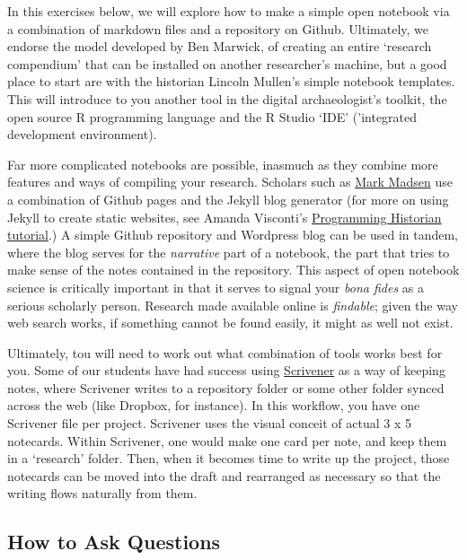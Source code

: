 \documentclass[english,]{book}
\begin{document}
In this exercises below, we will explore how to make a simple open
notebook via a combination of markdown files and a repository on Github.
Ultimately, we endorse the model developed by Ben Marwick, of creating
an entire `research compendium' that can be installed on another
researcher's machine, but a good place to start are with the historian
Lincoln Mullen's simple notebook templates. This will introduce to you
another tool in the digital archaeologist's toolkit, the open source R
programming language and the R Studio `IDE' ('integrated development
environment).

Far more complicated notebooks are possible, inasmuch as they combine
more features and ways of compiling your research. Scholars such as
\href{http://notebook.madsenlab.org/}{Mark Madsen} use a combination of
Github pages and the Jekyll blog generator (for more on using Jekyll to
create static websites, see Amanda Visconti's
\href{http://programminghistorian.org/lessons/building-static-sites-with-jekyll-github-pages}{Programming
Historian tutorial}.) A simple Github repository and Wordpress blog can
be used in tandem, where the blog serves for the \emph{narrative} part
of a notebook, the part that tries to make sense of the notes contained
in the repository. This aspect of open notebook science is critically
important in that it serves to signal your \emph{bona fides} as a
serious scholarly person. Research made available online is
\emph{findable}; given the way web search works, if something cannot be
found easily, it might as well not exist.

Ultimately, tou will need to work out what combination of tools works
best for you. Some of our students have had success using
\href{https://www.literatureandlatte.com/scrivener.php}{Scrivener} as a
way of keeping notes, where Scrivener writes to a repository folder or
some other folder synced across the web (like Dropbox, for instance). In
this workflow, you have one Scrivener file per project. Scrivener uses
the visual conceit of actual 3 x 5 notecards. Within Scrivener, one
would make one card per note, and keep them in a `research' folder.
Then, when it becomes time to write up the project, those notecards can
be moved into the draft and rearranged as necessary so that the writing
flows naturally from them.

\subsection{How to Ask Questions}\label{how-to-ask-questions}
\end{document}
